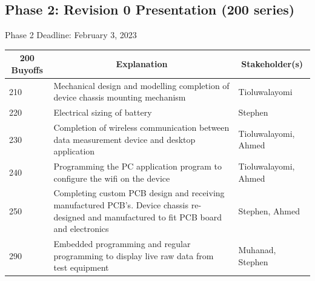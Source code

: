 \documentclass[12pt,titlepage]{article}
\begin{document}
\newpage
\noindent
\subsection{Phase 2: Revision 0 Presentation (200 series)}
Phase 2 Deadline: February 3, 2023\\

\begin{table}[H]
  \centering
  \begin{tabular}{|p{2cm}|p{10cm}|p{2cm}|}
  \hline
  \multicolumn{1}{|c|}{\textbf{200 Buyoffs}} & \multicolumn{1}{c|}{\textbf{Explanation}} & \multicolumn{1}{|c|}{\textbf{Stakeholder(s)}}
  \\ \hline
  210
  & Mechanical design and modelling completion of device chassis mounting mechanism
  & Tioluwalayomi
  \newline                                
  \\ \hline

  220
  & Electrical sizing of battery
  & Stephen
  \newline                                
  \\ \hline

  230                              
  & Completion of wireless communication between data measurement device and desktop application 
  & Tioluwalayomi, Ahmed
  \newline                                
  \\ \hline


  240                          
  & Programming the PC application program to configure the wifi on the device
  & Tioluwalayomi, Ahmed
  \newline                                
  \\ \hline

  250                          
  & Completing custom PCB design and receiving manufactured PCB's. Device chassis re-designed and manufactured to fit PCB board and electronics
  & Stephen, Ahmed
  \newline                                
  \\ \hline

  290                                
  & Embedded programming and regular programming to display live raw data from test equipment
  & Muhanad, Stephen 
  \newline                            
  \\ \hline

  \end{tabular}
\end{table}
\newpage
\end{document}
